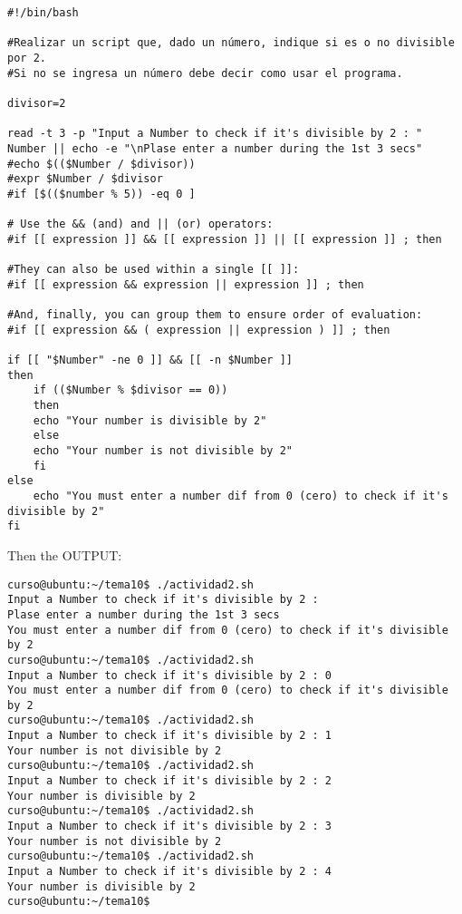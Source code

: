 \documentclass[a4paper,11pt,spanish]{article} %
\newenvironment{myscriptlisting}
{\begin{list}{}{\setlength{\leftmargin}{1em}}\item\scriptsize\bfseries}
{\end{list}}
\begin{document}
\begin{myscriptlisting}
 \begin{verbatim}
#!/bin/bash

#Realizar un script que, dado un número, indique si es o no divisible por 2.
#Si no se ingresa un número debe decir como usar el programa.

divisor=2

read -t 3 -p "Input a Number to check if it's divisible by 2 : " Number || echo -e "\nPlase enter a number during the 1st 3 secs"
#echo $(($Number / $divisor)) 
#expr $Number / $divisor  
#if [$(($number % 5)) -eq 0 ]

# Use the && (and) and || (or) operators:
#if [[ expression ]] && [[ expression ]] || [[ expression ]] ; then

#They can also be used within a single [[ ]]:
#if [[ expression && expression || expression ]] ; then

#And, finally, you can group them to ensure order of evaluation:
#if [[ expression && ( expression || expression ) ]] ; then

if [[ "$Number" -ne 0 ]] && [[ -n $Number ]]
then
	if (($Number % $divisor == 0))
	then
    echo "Your number is divisible by 2"
	else
    echo "Your number is not divisible by 2"
	fi
else
	echo "You must enter a number dif from 0 (cero) to check if it's divisible by 2"
fi
 \end{verbatim}
\end{myscriptlisting}

Then the OUTPUT:

\begin{myscriptlisting}
 \begin{verbatim}
curso@ubuntu:~/tema10$ ./actividad2.sh
Input a Number to check if it's divisible by 2 : 
Plase enter a number during the 1st 3 secs
You must enter a number dif from 0 (cero) to check if it's divisible by 2
curso@ubuntu:~/tema10$ ./actividad2.sh
Input a Number to check if it's divisible by 2 : 0
You must enter a number dif from 0 (cero) to check if it's divisible by 2
curso@ubuntu:~/tema10$ ./actividad2.sh
Input a Number to check if it's divisible by 2 : 1
Your number is not divisible by 2
curso@ubuntu:~/tema10$ ./actividad2.sh
Input a Number to check if it's divisible by 2 : 2
Your number is divisible by 2
curso@ubuntu:~/tema10$ ./actividad2.sh
Input a Number to check if it's divisible by 2 : 3
Your number is not divisible by 2
curso@ubuntu:~/tema10$ ./actividad2.sh
Input a Number to check if it's divisible by 2 : 4
Your number is divisible by 2
curso@ubuntu:~/tema10$ 
 \end{verbatim}
\end{myscriptlisting}
\end{document}
